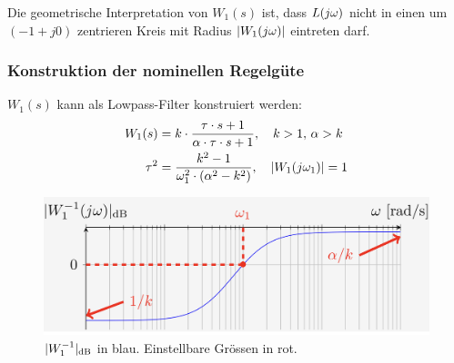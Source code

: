         Die geometrische Interpretation von $W_1(s)$ ist, dass $L(j\omega)$ nicht in einen um $(-1 + j0)$ zentrieren Kreis mit Radius $|W_1(j\omega)|$ eintreten darf.
    
    \subsubsection{Konstruktion der nominellen Regelgüte}
        $W_1(s)$ kann als Lowpass-Filter konstruiert werden:
        \begin{align*}
            W_1(s) &= k\cdot\frac{\tau\cdot s + 1}{\alpha\cdot\tau\cdot s + 1}, \quad k > 1,\, \alpha > k\\
            \tau^2 &= \frac{k^2 - 1}{\omega_1^2\cdot(\alpha^2-k^2)}, \quad |W_1(j\omega_1)| = 1
        \end{align*}
        
        \begin{figure}[H]
            \centering
            \includegraphics[width = 0.8\linewidth]{images/03/W_1.jpeg}
            \caption{$|W_1^{-1}|_\textnormal{dB}$ in blau. Einstellbare Grössen in rot.}
        \end{figure}

